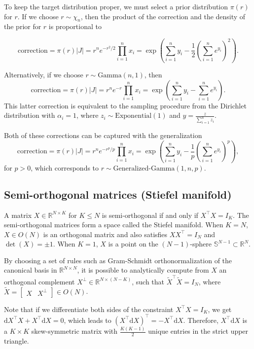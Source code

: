 \documentclass[11pt]{article}
\newcommand{\dv}[1]{\mathrm{d}{#1}}
\begin{document}
To keep the target distribution proper, we must select a prior
distribution $\pi(r)$ for $r$.  If we choose $r \sim \chi_n$, then the
product of the correction and the density of the prior for $r$ is
proportional to

\[
  \mathrm{correction}
  = \pi(r) |J| = r^n e^{-r^2/2} \prod_{i=1}^n x_i
  = \exp\left(\sum_{i=1}^n y_i - \frac{1}{2}\left(\sum_{i=1}^n
      e^{y_i}\right)^2\right).
\]

Alternatively, if we choose $r \sim \mathrm{Gamma}(n, 1)$, then
\[
  \mathrm{correction} = \pi(r) |J| = r^n e^{-r} \prod_{i=1}^n x_i =
  \exp\left(\sum_{i=1}^n y_i - \sum_{i=1}^n e^{y_i}\right).
\]
This latter correction is equivalent to the sampling procedure from
the Dirichlet distribution with $\alpha_i=1$, where
$z_i \sim \mathrm{Exponential}(1)$ and
$y = \frac{z}{\sum_{i=1}^n z_i}$.

Both of these corrections can be captured with the generalization
\[
  \mathrm{correction}
  = \pi(r) |J|
  = r^n e^{-r^p/p} \prod_{i=1}^n x_i
  = \exp\left(\sum_{i=1}^n y_i - \frac{1}{p} \left(\sum_{i=1}^n e^{y_i}\right)^p\right),
\]
for $p > 0$, which corresponds to $r \sim \text{Generalized-Gamma}(1, n, p)$.

\subsection{Semi-orthogonal matrices (Stiefel manifold)}

A matrix $X \in \mathbb{R}^{N \times K}$ for $K \le N$ is semi-orthogonal if and only if $X^\top X = I_K$.
The semi-orthogonal matrices form a space called the Stiefel manifold.
When $K=N$, $X \in O(N)$ is an orthogonal matrix and also satisfies $X X^\top = I_N$ and $\det(X) = \pm 1$.
When $K=1$, $X$ is a point on the $(N-1)$-sphere $\mathbb{S}^{N-1} \subset \mathbb{R}^N$.

By choosing a set of rules such as Gram-Schmidt orthonormalization of the canonical basis in $\mathbb{R}^{N \times N}$, it is possible to analytically compute from $X$ an orthogonal complement $X^\perp \in \mathbb{R}^{N \times (N - K)}$, such that $\tilde{X}^\top \tilde{X} = I_N$, where $\tilde{X} = \begin{bmatrix}X & X^\perp \end{bmatrix} \in O(N)$.

Note that if we differentiate both sides of the constraint $X^\top X = I_K$, we get $\dv{X}^\top X + X^\top \dv{X} = 0$, which leads to $(X^\top \dv{X})^\top = - X^\top \dv{X}$.
Therefore, $X^\top \dv{X}$ is a $K \times K$ skew-symmetric matrix with $\frac{K(K-1)}{2}$ unique entries in the strict upper triangle.
\end{document}
